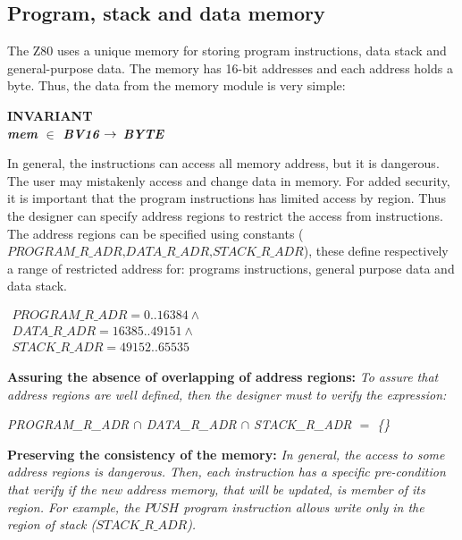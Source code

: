 \documentclass[a4paper]{llncs}
\begin{document}
\subsection{Program, stack and data memory}

The Z80 uses a unique memory for storing program instructions, data stack and
general-purpose data. The memory has 16-bit addresses and each address holds a byte.
Thus, the data from the memory module is very simple:

\begin{sloppypar}
\bf INVARIANT \\
\hspace*{0.10in}\it mem  $\in$  \it BV16  $\rightarrow$  \it BYTE 

\end{sloppypar}
  
In general, the instructions can access all memory address, but it is dangerous. The user may mistakenly
access and change data in memory. For added  security, it is important that the program instructions has
limited access by region. Thus the designer can specify address regions to restrict the access from
instructions. The address regions can be specified using constants
($\textit{PROGRAM\_R\_ADR,DATA\_R\_ADR,STACK\_R\_ADR}$), these define respectively a range of restricted
address for: programs instructions, general purpose data and data stack.

$
\begin{array}{l}
\textit{PROGRAM\_R\_ADR} = 0..16384 \land\\
\textit{DATA\_R\_ADR} = 16385..49151 \land\\
\textit{STACK\_R\_ADR} = 49152..65535
\end{array}
$

\textbf{Assuring the absence of overlapping of address regions:}
 \emph{To assure that address regions are well defined, then the designer must to verify the expression:}
\begin{sloppypar}
\hspace*{0.10in}\it PROGRAM\_R\_ADR $\cap$ DATA\_R\_ADR $\cap$  STACK\_R\_ADR $=$ \{\}
\end{sloppypar}
 
\textbf{Preserving the consistency of the memory:} \emph{In general, the access to
some address regions is dangerous. Then, each instruction has a specific pre-condition that verify
if the new address memory, that will be updated, is member of its region. For example, the $\textit{PUSH}$
program instruction allows write only in the region of stack ($\textit{STACK\_R\_ADR}$).}
\end{document}
